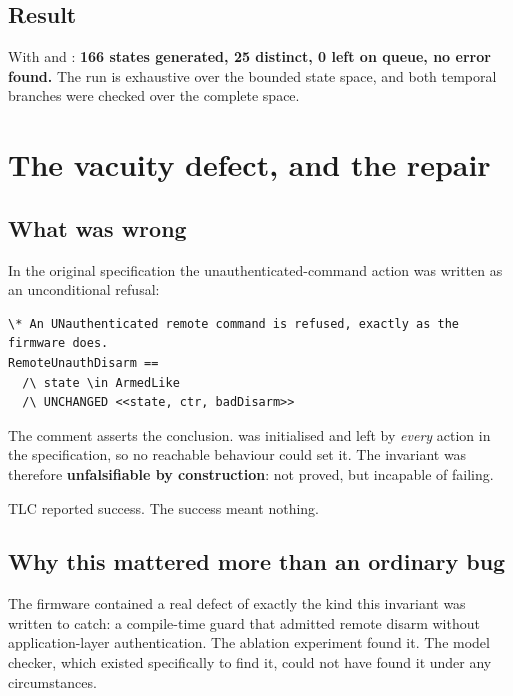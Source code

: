 \subsection{Result}

With  and : \textbf{166 states generated, 25
distinct, 0 left on queue, no error found.} The run is exhaustive over the bounded state space,
and both temporal branches were checked over the complete space.

\section{The vacuity defect, and the repair}\label{sec:formal-vacuity}

\subsection{What was wrong}

In the original specification the unauthenticated-command action was written as an
unconditional refusal:

\begin{lstlisting}[style=tla,caption={The defective action, as originally written (reconstructed
from the repair commit).},label={lst:vacuous}]
\* An UNauthenticated remote command is refused, exactly as the firmware does.
RemoteUnauthDisarm ==
  /\ state \in ArmedLike
  /\ UNCHANGED <<state, ctr, badDisarm>>
\end{lstlisting}

The comment asserts the conclusion.  was initialised  and left
 by \emph{every} action in the specification, so no reachable behaviour could set
it. The invariant  was therefore \textbf{unfalsifiable by
construction}: not proved, but incapable of failing.

TLC reported success. The success meant nothing.

\subsection{Why this mattered more than an ordinary bug}

The firmware contained a real defect of exactly the kind this invariant was written to catch: a
compile-time guard that admitted remote disarm without application-layer authentication. The
ablation experiment found it. The model checker, which existed specifically to find it, could
not have found it under any circumstances.

